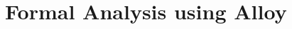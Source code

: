 \documentclass[../rasd.tex]{subfiles}
\begin{document}
\chapter{Formal Analysis using Alloy}
\thispagestyle{fancy}
\end{document}
